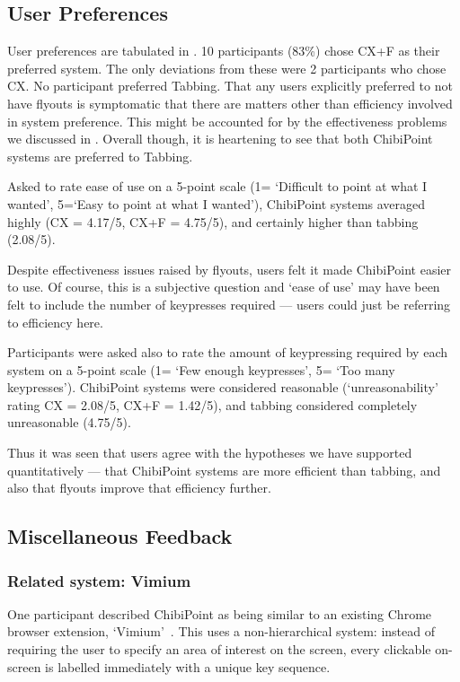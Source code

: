 \documentclass[11pt,openright,a4paper]{report}
\begin{document}
\subsection{User Preferences}
User preferences are tabulated in . 10 participants (83\%) chose CX+F as their preferred system. The only deviations from these were 2 participants who chose CX. No participant preferred Tabbing. That any users explicitly preferred to not have flyouts is symptomatic that there are matters other than efficiency involved in system preference. This might be accounted for by the effectiveness problems we discussed in . Overall though, it is heartening to see that both ChibiPoint systems are preferred to Tabbing.

Asked to rate ease of use on a 5-point scale (1= `Difficult to point at what I wanted', 5=`Easy to point at what I wanted'), ChibiPoint systems averaged highly (CX = 4.17/5, CX+F = 4.75/5), and certainly higher than tabbing (2.08/5).

Despite effectiveness issues raised by flyouts, users felt it made ChibiPoint easier to use. Of course, this is a subjective question and `ease of use' may have been felt to include the number of keypresses required --- users could just be referring to efficiency here.

Participants were asked also to rate the amount of keypressing required by each system on a 5-point scale (1= `Few enough keypresses', 5= `Too many keypresses'). ChibiPoint systems were considered reasonable (`unreasonability' rating CX = 2.08/5, CX+F = 1.42/5), and tabbing considered completely unreasonable (4.75/5).

Thus it was seen that users agree with the hypotheses we have supported quantitatively --- that ChibiPoint systems are more efficient than tabbing, and also that flyouts improve that efficiency further.

\subsection{Miscellaneous Feedback}
\subsubsection{Related system: Vimium}
One participant described ChibiPoint as being similar to an existing Chrome browser extension, `Vimium'~\cite{vimium}. This uses a non-hierarchical system: instead of requiring the user to specify an area of interest on the screen, every clickable on-screen is labelled immediately with a unique key sequence.
\end{document}
